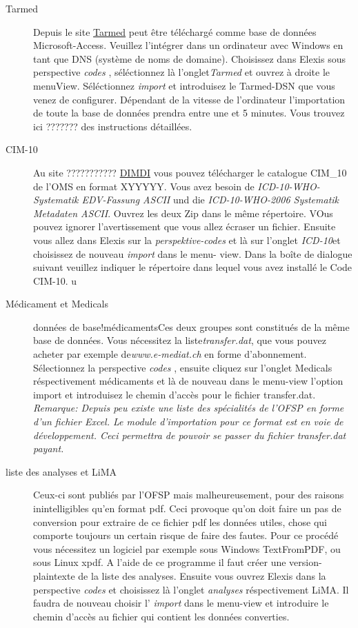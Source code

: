 \begin{description}
 \item[Tarmed] Depuis le site \href{www.tarmedsuisse.ch}{Tarmed} peut être téléchargé comme base de données Microsoft-Access. Veuillez l'intégrer dans un ordinateur avec Windows en tant que DNS (système de noms de domaine). Choisissez dans Elexis sous perspective \textit{codes} , séléctionnez là l'onglet\textit{Tarmed}  et ouvrez à droite le menuView. 
 Séléctionnez  \textit{import}  et introduisez le Tarmed-DSN que vous venez de configurer. Dépendant de la vitesse de l'ordinateur l'importation de toute la base de données prendra entre une et 5 minutes. Vous trouvez ici ??????? des instructions détaillées.
 \item[CIM-10] Au site ???????????
 \href{http://www.dimdi.de/dynamic/de/klassi/downloadcenter/icd-10-who/version2006/systematik/}{DIMDI} vous pouvez télécharger le catalogue CIM_10 de l'OMS en format XYYYYY. Vous avez besoin de \textit{ICD-10-WHO-Systematik EDV-Fassung ASCII} und die \textit{ICD-10-WHO-2006 Systematik Metadaten ASCII}. Ouvrez les deux Zip dans le même répertoire. VOus pouvez ignorer l'avertissement que vous allez écraser un fichier. Ensuite vous allez dans Elexis sur la \textit{perspektive-codes} et là sur l'onglet \textit{ICD-10}et choisissez de nouveau \textit{import} dans le menu- view.
 Dans la boîte de dialogue suivant veuillez indiquer le répertoire dans lequel vous avez installé le Code CIM-10.  u
 \item[Médicament et  Medicals] \indexname{données de base!médicaments}Ces deux groupes sont constitués de la même base de données. Vous nécessitez la liste\textit{transfer.dat}, que vous pouvez acheter par exemple de\textit{www.e-mediat.ch} en forme d'abonnement.
 Sélectionnez la perspective \textit{codes} , ensuite cliquez sur l'onglet Medicals réspectivement médicaments et là de nouveau dans le menu-view l'option import et introduisez le chemin d'accès pour le fichier transfer.dat.
\textit{Remarque: Depuis peu existe une liste des spécialités de l'OFSP en forme d'un fichier Excel. Le module d'importation pour ce format est en voie de développement. Ceci permettra de pouvoir se passer du fichier transfer.dat payant. }
 \item[liste des analyses et LiMA] Ceux-ci sont publiés par l'OFSP mais malheureusement, pour des raisons inintelligibles qu'en format pdf. Ceci provoque qu'on doit faire un pas de conversion pour extraire de ce fichier pdf les données utiles, chose qui comporte toujours un certain risque de faire des fautes. Pour ce procédé vous nécessitez un logiciel par exemple sous Windows TextFromPDF, ou sous Linux xpdf. A l'aide de ce programme il faut créer une version-plaintexte de la liste des analyses. Ensuite vous ouvrez Elexis dans la perspective  \textit{codes}  et choisissez là l'onglet \textit{analyses} réspectivement LiMA. Il faudra de nouveau choisir l'  \textit{import} dans le menu-view et introduire le chemin d'accès au fichier qui contient les données converties.
 \end{description}

